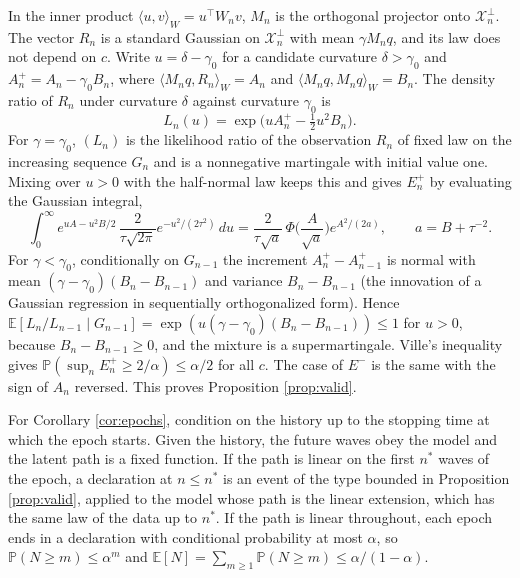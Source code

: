 \documentclass[Afour,sageh,times]{sagej}
\theoremstyle{definition}
\newcommand{\E}{\mathbb{E}}
\newcommand{\Prob}{\mathbb{P}}
\begin{document}
In the inner product $\langle u, v \rangle_W = u^\top W_n v$, $M_n$ is the orthogonal projector onto $\mathcal{X}_n^{\perp}$. The vector $R_n$ is a standard Gaussian on $\mathcal{X}_n^{\perp}$ with mean $\gamma M_n q$, and its law does not depend on $c$. Write $u = \delta - \gamma_0$ for a candidate curvature $\delta > \gamma_0$ and $A_n^{+} = A_n - \gamma_0 B_n$, where $\langle M_n q, R_n \rangle_W = A_n$ and $\langle M_n q, M_n q\rangle_W = B_n$. The density ratio of $R_n$ under curvature $\delta$ against curvature $\gamma_0$ is
\[
L_n(u) = \exp\!\big(u A_n^{+} - \tfrac{1}{2} u^2 B_n\big).
\]
For $\gamma = \gamma_0$, $(L_n)$ is the likelihood ratio of the observation $R_n$ of fixed law on the increasing sequence $G_n$ and is a nonnegative martingale with initial value one. Mixing over $u > 0$ with the half-normal law keeps this and gives $E_n^{+}$ by evaluating the Gaussian integral,
\[
\int_0^\infty e^{u A - u^2 B/2}\, \frac{2}{\tau\sqrt{2\pi}} e^{-u^2/(2\tau^2)}\, du
= \frac{2}{\tau\sqrt{a}}\, \Phi\!\Big(\frac{A}{\sqrt{a}}\Big) e^{A^2/(2a)}, \qquad a = B + \tau^{-2}.
\]
For $\gamma < \gamma_0$, conditionally on $G_{n-1}$ the increment $A_n^{+} - A_{n-1}^{+}$ is normal with mean $(\gamma - \gamma_0)(B_n - B_{n-1})$ and variance $B_n - B_{n-1}$ (the innovation of a Gaussian regression in sequentially orthogonalized form). Hence $\E[L_n/L_{n-1} \mid G_{n-1}] = \exp(u(\gamma - \gamma_0)(B_n - B_{n-1})) \le 1$ for $u > 0$, because $B_n - B_{n-1} \ge 0$, and the mixture is a supermartingale. Ville's inequality gives $\Prob(\sup_n E_n^{+} \ge 2/\alpha) \le \alpha/2$ for all $c$. The case of $E^{-}$ is the same with the sign of $A_n$ reversed. This proves Proposition \ref{prop:valid}.

For Corollary \ref{cor:epochs}, condition on the history up to the stopping time at which the epoch starts. Given the history, the future waves obey the model and the latent path is a fixed function. If the path is linear on the first $n^{*}$ waves of the epoch, a declaration at $n \le n^{*}$ is an event of the type bounded in Proposition \ref{prop:valid}, applied to the model whose path is the linear extension, which has the same law of the data up to $n^{*}$. If the path is linear throughout, each epoch ends in a declaration with conditional probability at most $\alpha$, so $\Prob(N \ge m) \le \alpha^m$ and $\E[N] = \sum_{m \ge 1} \Prob(N \ge m) \le \alpha/(1-\alpha)$.
\end{document}

